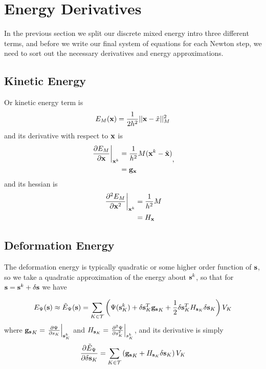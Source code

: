 
\section{Energy Derivatives}

In the previous section we split our discrete mixed energy intro three different terms, and before we write our final system of equations for each Newton step, we need to sort out the necessary derivatives and energy approximations.

\subsection{Kinetic Energy}
Or kinetic energy term is
\begin{align}
E_M (\mathbf{x}) &= \frac{1}{2h^2} ||\mathbf{x} - \tilde{x}||_M^2 \\
\end{align}
and its derivative with respect to $\mathbf{x}$ is
\begin{equation}
\begin{split}
\left. \frac{\partial E_M }{\partial \mathbf{x}} \right|_{\mathbf{x}^k} &= \frac{1}{h^2}M(\mathbf{x}^k - \tilde{\mathbf{x}}) \\
&=  {\mathbf{g}_{\mathbf{x}}}
\end{split},
\end{equation}
and its hessian is
\begin{equation}
\begin{split}
\left. \frac{\partial^2 E_M }{\partial \mathbf{x}^2} \right|_{\mathbf{x}^k} &= \frac{1}{h^2}M \\
&=  {H_{\mathbf{x}}}
\end{split}
\end{equation}

\subsection{Deformation Energy}
The deformation energy is typically quadratic or some higher order function of $\mathbf{s}$, so we take a quadratic approximation of the energy about $\mathbf{s}^k$, so that for $\mathbf{s}=\mathbf{s}^k + \delta \mathbf{s}$ we have

\begin{equation}
E_\Psi (\mathbf{s}) \approx \tilde{E}_\Psi (\mathbf{s}) = \sum_{K \in \mathcal{T}} \left(\Psi(\mathbf{s}_K^k) + \delta \mathbf{s}_K^T {\mathbf{g}_{\mathbf{s}}}_K + \frac{1}{2}\delta \mathbf{s}_K^T {H_{\mathbf{s}_K}} \delta \mathbf{s}_K \right) V_K
\end{equation}
where 
${\mathbf{g}_{\mathbf{s}}}_K =\left.\frac{\partial \Psi}{\partial s_K}\right|_{\mathbf{s}_K^k}$ and
${H_{\mathbf{s}_K}}=\left.\frac{\partial^2 \Psi}{\partial s_K^2}\right|_{s_K^k}$, and its derivative is simply
\begin{equation}
\frac{\partial \tilde{E}_\Psi}{\partial \delta \mathbf{s}_K} =
\sum_{K \in \mathcal{T}} \left({\mathbf{g}_{\mathbf{s}}}_K + {H_{\mathbf{s}_K}} \delta \mathbf{s}_K \right) V_K
\end{equation}


